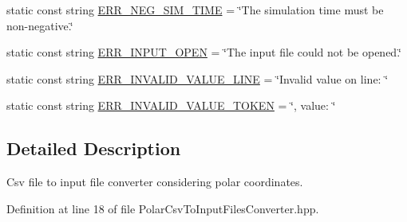 \begin{DoxyCompactItemize}
static const string \hyperlink{classmultiscale_1_1video_1_1PolarCsvToInputFilesConverter_aebefa6d5430519fc12081470ea4c1ae9}{E\-R\-R\-\_\-\-N\-E\-G\-\_\-\-S\-I\-M\-\_\-\-T\-I\-M\-E} = \char`\"{}The simulation time must be non-\/negative.\char`\"{}
\item 
static const string \hyperlink{classmultiscale_1_1video_1_1PolarCsvToInputFilesConverter_a4997621ae07f6696b1f0ec3cb11bbaeb}{E\-R\-R\-\_\-\-I\-N\-P\-U\-T\-\_\-\-O\-P\-E\-N} = \char`\"{}The input file could not be opened.\char`\"{}
\item 
static const string \hyperlink{classmultiscale_1_1video_1_1PolarCsvToInputFilesConverter_aedff7359498b5b318d113a83d37e6450}{E\-R\-R\-\_\-\-I\-N\-V\-A\-L\-I\-D\-\_\-\-V\-A\-L\-U\-E\-\_\-\-L\-I\-N\-E} = \char`\"{}Invalid value on line\-: \char`\"{}
\item 
static const string \hyperlink{classmultiscale_1_1video_1_1PolarCsvToInputFilesConverter_aa8f1c11b3df77f715af4202dfd2c308b}{E\-R\-R\-\_\-\-I\-N\-V\-A\-L\-I\-D\-\_\-\-V\-A\-L\-U\-E\-\_\-\-T\-O\-K\-E\-N} = \char`\"{}, value\-: \char`\"{}
\end{DoxyCompactItemize}


\subsection{Detailed Description}
Csv file to input file converter considering polar coordinates. 

Definition at line 18 of file Polar\-Csv\-To\-Input\-Files\-Converter.\-hpp.



